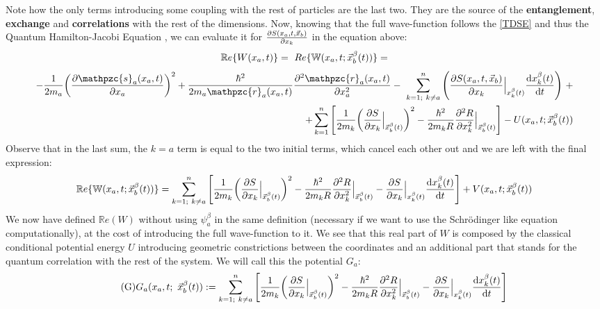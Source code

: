 \documentclass[11pt, a4paper]{article} %
\newcommand{\R}{\mathbb{R}} %
\newcommand{\z}{\mathpzc{s}}
\newcommand{\p}{\mathpzc{r}}
\newcommand{\W}{\mathbb{W}}
\begin{document}
Note how the only terms introducing some coupling with the rest of particles are the last two. They are the source of the {\bf entanglement}, {\bf exchange} and {\bf correlations} with the rest of the dimensions. Now, knowing that the full wave-function follows the \ref{TDSE} and thus the Quantum Hamilton-Jacobi Equation \cite{nireTFGie}, we can evaluate it for $\pdv{S(x_a,t,\vec{x}_b)}{x_k}$ in the equation above:\vspace{-0.3cm}
$$
\R e\{W(x_a,t)\}=\ Re\{\W(x_a,t; \vec{x}_b^\beta(t))\}=\vspace{-0.14cm}
$$
\begin{equation*}
\begin{split}
-\frac{1}{2m_a} \qty(\pdv{\z_a(x_a,t)}{x_a})^2 +\frac{\hbar^2}{2m_a\p_a(x_a,t)}\pdv[2]{\p_a(x_a, t)}{x_a}- \ \sum_{k=1;\ k\neq a}^n \qty( \pdv{S(x_a,t,\vec{x}_b)}{x_k}\Big\rvert_{x_k^\beta(t)} \dv{x_k^\beta(t)}{t})\ + \\ \ +\sum_{k=1}^n \qty[\frac{1}{2m_k} \qty(\pdv{S}{x_k}\Big\rvert_{\vec{x}_b^\beta(t)})^2 -\frac{\hbar^2}{2m_kR}\pdv[2]{R}{x_k}\Big\rvert_{\vec{x}_b^\beta(t)} ] - U(x_a,t; \vec{x}_b^\beta(t))
\end{split}
\end{equation*}
Observe that in the last sum, the $k=a$ term is equal to the two initial terms, which cancel each other out and we are left with the final expression:\vspace{-0.3cm}\label{ReW}
\begin{equation*}
\R e\{\W(x_a,t; \vec{x}_b^\beta(t))\}=\sum_{k=1;\ k \neq a}^n \qty[\frac{1}{2m_k} \qty(\pdv{S}{x_k}\Big\rvert_{\vec{x}_b^\beta(t)})^2 -\frac{\hbar^2}{2m_kR}\pdv[2]{R}{x_k}\Big\rvert_{\vec{x}_b^\beta(t)} -\pdv{S}{x_k}\Big\rvert_{x_k^\beta(t)} \dv{x_k^\beta(t)}{t} ] + V(x_a,t; \vec{x}_b^\beta(t))
\end{equation*}
We now have defined $\R e(W)$ without using $\psi_a^\beta$ in the same definition (necessary if we want to use the Schrödinger like equation computationally), at the cost of introducing the full wave-function to it. We see that this real part of $W$ is composed by the classical conditional potential energy $U$ introducing geometric constrictions between the coordinates and an additional part that stands for the quantum correlation with the rest of the system. We will call this the potential $G_a$:
\begin{equation}\label{G}\tag{G}
G_a(x_a,t;\ \vec{x}_b^\beta(t)):=  \sum_{k=1;\ k \neq a}^n \qty[\frac{1}{2m_k} \qty(\pdv{S}{x_k}\Big\rvert_{\vec{x}_b^\beta(t)})^2 -\frac{\hbar^2}{2m_kR}\pdv[2]{R}{x_k}\Big\rvert_{\vec{x}_b^\beta(t)} -\pdv{S}{x_k}\Big\rvert_{x_k^\beta(t)} \dv{x_k^\beta(t)}{t} ]
\end{equation}
\end{document}

